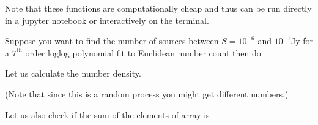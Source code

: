 \documentclass[letterpaper,10pt,english]{sphinxmanual}
\begin{document}
\sphinxAtStartPar
Note that these functions are computationally cheap and thus can be run directly in a jupyter notebook or interactively on the terminal.

\sphinxAtStartPar
{}

\sphinxAtStartPar
Suppose you want to find the number of sources between \(S=10^{-6}\) and \(10^{-1}\mathrm{Jy}\) for a \(7^{\mathrm{th}}\) order log\sphinxhyphen{}log polynomial fit to Euclidean number count then do

\begin{sphinxVerbatim}[commandchars=\\\{\}]
   
   
  
\end{sphinxVerbatim}

\sphinxAtStartPar
Let us calculate the number density.

\begin{sphinxVerbatim}[commandchars=\\\{\}]
  
\end{sphinxVerbatim}

\sphinxAtStartPar
(Note that since this is a random process you might get different numbers.)

\sphinxAtStartPar
Let us also check if the sum of the elements of array  is 

\begin{sphinxVerbatim}[commandchars=\\\{\}]
\end{sphinxVerbatim}
\end{document}
